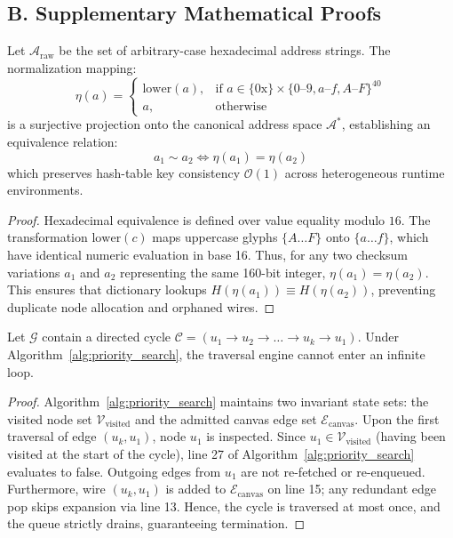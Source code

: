 \subsection*{B. Supplementary Mathematical Proofs}

\begin{lemma}
Let $\mathcal{A}_{\text{raw}}$ be the set of arbitrary-case hexadecimal address strings. The normalization mapping:
\begin{equation}
    \eta(a) = \begin{cases}
    \text{lower}(a), & \text{if } a \in \{0\text{x}\} \times \{0\text{--}9, a\text{--}f, A\text{--}F\}^{40} \\
    a, & \text{otherwise}
    \end{cases}
\end{equation}
is a surjective projection onto the canonical address space $\mathcal{A}^*$, establishing an equivalence relation:
\begin{equation}
    a_1 \sim a_2 \iff \eta(a_1) = \eta(a_2)
\end{equation}
which preserves hash-table key consistency $\mathcal{O}(1)$ across heterogeneous runtime environments.
\end{lemma}

\begin{proof}
Hexadecimal equivalence is defined over value equality modulo $16$. The transformation $\text{lower}(c)$ maps uppercase glyphs $\{A\dots F\}$ onto $\{a\dots f\}$, which have identical numeric evaluation in base 16. Thus, for any two checksum variations $a_1$ and $a_2$ representing the same 160-bit integer, $\eta(a_1) = \eta(a_2)$. This ensures that dictionary lookups $H(\eta(a_1)) \equiv H(\eta(a_2))$, preventing duplicate node allocation and orphaned wires.
\end{proof}

\begin{lemma}
Let $\mathcal{G}$ contain a directed cycle $\mathcal{C} = (u_1 \to u_2 \to \dots \to u_k \to u_1)$. Under Algorithm~\ref{alg:priority_search}, the traversal engine cannot enter an infinite loop.
\end{lemma}

\begin{proof}
Algorithm~\ref{alg:priority_search} maintains two invariant state sets: the visited node set $\mathcal{V}_{\text{visited}}$ and the admitted canvas edge set $\mathcal{E}_{\text{canvas}}$.
Upon the first traversal of edge $(u_k, u_1)$, node $u_1$ is inspected. Since $u_1 \in \mathcal{V}_{\text{visited}}$ (having been visited at the start of the cycle), line 27 of Algorithm~\ref{alg:priority_search} evaluates to false. Outgoing edges from $u_1$ are not re-fetched or re-enqueued. Furthermore, wire $(u_k, u_1)$ is added to $\mathcal{E}_{\text{canvas}}$ on line 15; any redundant edge pop skips expansion via line 13. Hence, the cycle is traversed at most once, and the queue strictly drains, guaranteeing termination.
\end{proof}

